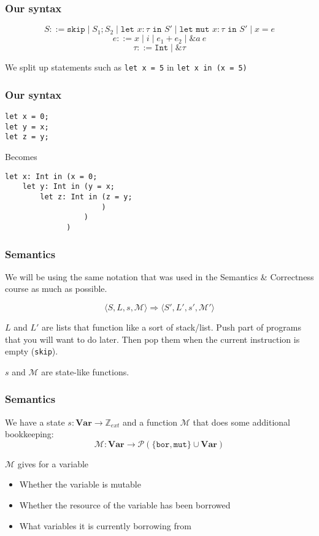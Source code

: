 \documentclass{beamer}
\newcommand{\sk}[0]{\texttt{skip}}
\newcommand{\letm}[2]{\texttt{let }#1 : \tau \texttt{ in } #2}
\newcommand{\sosb}[4]{\langle #1, #2, #3, \mathcal{#4} \rangle}
\newcommand{\letmut}[2]{\texttt{let mut }#1 : \tau \texttt{ in } #2}
\begin{document}
\begin{frame}[fragile]
\frametitle{Our syntax}

$$S ::= \sk \mid S_1; S_2 \mid \letm{x}{S'} \mid \letmut{x}{S'} \mid x = e$$
$$e ::= x \mid i \mid e_1 + e_2 \mid \&a~e$$
$$\tau ::= \texttt{Int} \mid \& \tau$$

We split up statements such as \texttt{let x = 5} in \texttt{let x in (x = 5)}
\end{frame}


\begin{frame}[fragile]
\frametitle{Our syntax}
\begin{lstlisting}
let x = 0;
let y = x;
let z = y;
\end{lstlisting}
Becomes
\begin{lstlisting}
let x: Int in (x = 0;
    let y: Int in (y = x;
        let z: Int in (z = y;
                      )
                  )
              )
\end{lstlisting}
\end{frame}

\begin{frame}[fragile]
\frametitle{Semantics}
We will be using the same notation that was used in the Semantics \& Correctness course as much as possible.

$$\sosb{S}{L}{s}{M} \Rightarrow \sosb{S'}{L'}{s'}{M'}$$

$L$ and $L'$ are lists that function like a sort of stack/list. Push part of programs that you will want to do later. Then pop them when the current instruction is empty (\sk).

$s$ and $\mathcal{M}$ are state-like functions.
\end{frame}

\begin{frame}[fragile]
\frametitle{Semantics}
We have a state $s: \textbf{Var} \to \mathbb{Z}_{ext}$ and a function $\mathcal{M}$ that does some additional bookkeeping:
$$\mathcal{M}: \textbf{Var} \to \mathcal{P}(\{\texttt{bor}, \texttt{mut}\} \cup \textbf{Var})$$ 

$\mathcal{M}$ gives for a variable
\begin{itemize}
\item Whether the variable is mutable
\item Whether the resource of the variable has been borrowed
\item What variables it is currently borrowing from
\end{itemize}
\end{frame}
\end{document}
